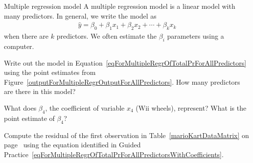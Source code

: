 \begin{onebox}{Multiple regression model}
A multiple regression model is a linear model with many predictors. In general, we write the model as
\begin{align*}
\hat{y} = \beta_0 + \beta_1 x_1 + \beta_2 x_2 + \cdots + \beta_k x_k %
\end{align*}
when there are $k$ predictors. We often estimate the $\beta_i$ parameters using a computer.
\end{onebox}

\begin{exercisewrap}
\begin{nexercise} \label{eqForMultipleRegrOfTotalPrForAllPredictorsWithCoefficients}
Write out the model in Equation~\eqref{eqForMultipleRegrOfTotalPrForAllPredictors} using the point estimates from Figure~\ref{outputForMultipleRegrOutputForAllPredictors}. How many predictors are there in this model?\footnotemark
\end{nexercise}
\end{exercisewrap}

\begin{exercisewrap}
\begin{nexercise}
What does $\beta_4$, the coefficient of variable $x_4$ (Wii wheels), represent? What is the point estimate of $\beta_4$?\footnotemark
\end{nexercise}
\end{exercisewrap}

\begin{exercisewrap}
\begin{nexercise} \label{computeMultipleRegressionResidualForMarioKart}%
Compute the residual of the first observation in Table~\ref{marioKartDataMatrix} on page~\pageref{marioKartDataMatrix} using the equation identified in Guided Practice~\ref{eqForMultipleRegrOfTotalPrForAllPredictorsWithCoefficients}.\footnotemark
\end{nexercise}
\end{exercisewrap}

